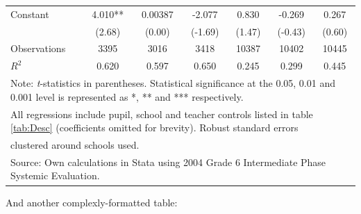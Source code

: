 \documentclass[12pt,preprint, authoryear]{article}
\numberwithin{equation}{section}
\numberwithin{figure}{section}
\numberwithin{table}{section}
\begin{document}
\begin{longtable}[htbp] {p{6cm}*{3}{c} | c c c}
Constant        &    4.010** &  0.00387         &   -2.077         &    0.830         &   -0.269         &    0.267         \\
                &   (2.68)         &   (0.00)         &  (-1.69)         &   (1.47)         &  (-0.43)         &   (0.60)         \\
\hline
Observations    &     3395         &     3016         &     3418         &    10387         &    10402         &    10445         \\
\(R^{2}\)       &    0.620         &    0.597         &    0.650         &    0.245         &    0.299         &    0.445         \\  \hline \hline
\multicolumn{7}{l}{Note: \textit{t}-statistics in parentheses. Statistical significance at the 0.05, 0.01 and 0.001 level is represented as *, ** and *** respectively.} \\
\multicolumn{7}{l}{All regressions include pupil, school and teacher controls listed in table \ref{tab:Desc} (coefficients omitted for brevity). Robust standard errors} \\
\multicolumn{7}{l}{clustered around schools used.}\\
\multicolumn{7}{l}{Source: Own calculations in Stata using 2004 Grade 6 Intermediate Phase Systemic Evaluation.}\\
\end{longtable}

\normalsize

\setcounter{table}{3}

\newpage

And another complexly-formatted table:

\scriptsize
\end{document}
